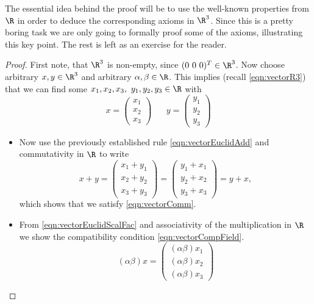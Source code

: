 \noindent
The essential idea behind the proof will be to use the well-known properties from $\R$ in order to deduce the corresponding axioms in $\R^3$.
Since this is a pretty boring task we are only going to formally proof some of the axioms, illustrating this key point.
The rest is left as an exercise for the reader.
\begin{proof}
	First note, that $\R^3$ is non-empty, since $(0~0~0)^T \in \R^3$. 
	Now choose arbitrary $x,y \in \R^3$ and arbitrary $\alpha, \beta \in \R$.
	This implies (recall \eqref{eqn:vectorR3}) that we can find some $x_1, x_2, x_3,~y_1, y_2, y_3 \in \R$ with
	\[ x = \left( \begin{array}{c} x_1 \\ x_2 \\ x_3 \end{array} \right)
		\hspace{20pt}
		y = \left( \begin{array}{c} y_1 \\ y_2 \\ y_3 \end{array}  \right)
	\]
	\begin{itemize}
		\item Now use the previously established rule \eqref{eqn:vectorEuclidAdd} and commutativity in $\R$ to write
			\begin{equation}
				x + y = \left( \begin{array}{c} x_1 + y_1 \\ x_2 + y_2 \\ x_3 + y_3 \end{array} \right)
					= \left( \begin{array}{c} y_1 + x_1 \\ y_2 + x_2 \\ y_3 + x_3 \end{array} \right)
					= y + x,
				\label{eqn:vectorEuclidProofComm}
			\end{equation}
			which shows that we satisfy \eqref{eqn:vectorComm}.
		\item From \eqref{eqn:vectorEuclidScalFac} and associativity of the multiplication in $\R$ we show the compatibility condition \eqref{eqn:vectorCompField}.
			\begin{equation}
				(\alpha \beta) x = \left( \begin{array}{c} (\alpha \beta) x_1 \\ (\alpha \beta) x_2 \\ (\alpha \beta) x_3 \end{array} \right)

\end{equation}
\end{itemize}
\end{proof}
